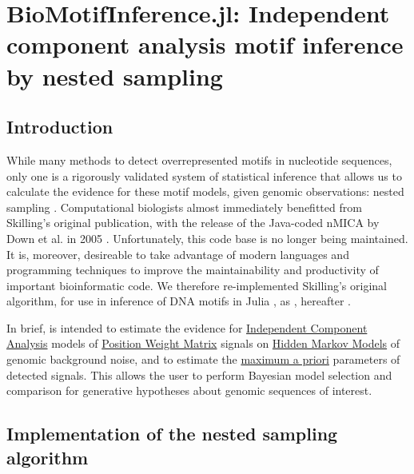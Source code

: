 \chapter{BioMotifInference.jl: Independent component analysis motif inference by nested sampling}
\label{chap:BMI}
\section{Introduction}
While many methods to detect overrepresented motifs in nucleotide sequences, only one is a rigorously validated system of statistical inference that allows us to calculate the evidence for these motif models, given genomic observations: nested sampling \cite{Skilling2006}. Computational biologists almost immediately benefitted from Skilling's original publication, with the release of the Java-coded nMICA by Down et al. in 2005 \cite{Down2005}. Unfortunately, this code base is no longer being maintained. It is, moreover, desireable to take advantage of modern languages and programming techniques to improve the maintainability and productivity of important bioinformatic code. We therefore re-implemented Skilling's original algorithm, for use in inference of DNA motifs in Julia \cite{Bezanson2015}, as , hereafter .

In brief,  is intended to estimate the evidence for \hyperref[ssec:ICA]{Independent Component Analysis} models of \hyperref[PWM]{Position Weight Matrix} signals on \hyperref[ssec:HMM]{Hidden Markov Models} of genomic background noise, and to estimate the \hyperref[ssec:MLE]{maximum a priori} parameters of detected signals. This allows the user to perform Bayesian model selection and comparison for generative hypotheses about genomic sequences of interest.

\section{Implementation of the nested sampling algorithm}

